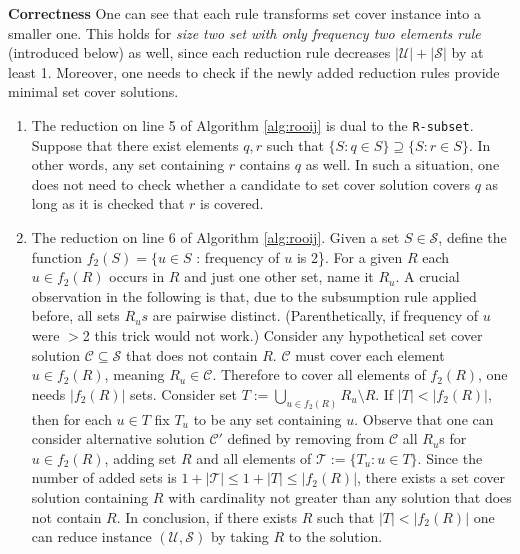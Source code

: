 \textbf{Correctness}
One can see that each rule transforms set cover instance into a smaller one. This holds for \textit{size two set with only frequency two elements rule} (introduced below) as well, since each reduction rule decreases $|\mathcal{U}| + |\mathcal{S}|$ by at least 1. Moreover, one needs to check if the newly added reduction rules provide minimal set cover solutions.
\begin{enumerate}
    \item The reduction on line 5 of Algorithm \ref{alg:rooij} is dual to the \texttt{R-subset}. Suppose that there exist elements $q, r$ such that $\{S : q \in S\} \supseteq \{S : r \in S\}$. In other words, any set containing $r$ contains $q$ as well. In such a situation, one does not need to check whether a candidate to set cover solution covers $q$ as long as it is checked that $r$ is covered.
    \item The reduction on line 6 of Algorithm \ref{alg:rooij}. Given a set $S \in \mathcal{S}$, define the function $f_2(S) = \{u \in S$ : frequency of $u$ is 2\}. For a given $R$ each $u\in f_2(R)$ occurs in $R$ and just one other set, name it $R_u$. A crucial observation in the following is that, due to the subsumption rule applied before, all sets $R_us$ are pairwise distinct. (Parenthetically, if frequency of $u$ were $>$2 this trick would not work.) Consider any hypothetical set cover solution $\mathcal{C} \subseteq \mathcal{S}$ that does not contain $R$. $\mathcal{C}$ must cover each element $u\in f_2(R)$, meaning $R_u\in \mathcal{C}$. Therefore to cover all elements of $f_2(R)$, one needs $|f_2(R)|$ sets. Consider set $T := \bigcup_{u \in f_2(R)} R_u \setminus R$. If $|T| < |f_2(R)|$, then for each $u \in T$ fix $T_u$ to be any set containing $u$. Observe that one can consider alternative solution $\mathcal{C'}$ defined by removing from $\mathcal{C}$ all $R_u$s for $u \in f_2(R)$, adding set $R$ and all elements of $\mathcal{T} := \{T_u : u \in T\}$. Since the number of added sets is $1 + |\mathcal{T}| \leq 1 + |T| \leq |f_2(R)|$, there exists a set cover solution containing $R$ with cardinality not greater than any solution that does not contain $R$. In conclusion, if there exists $R$ such that $|T| < |f_2(R)|$ one can reduce instance $(\mathcal{U}, \mathcal{S})$ by taking $R$ to the solution.

\end{enumerate}

